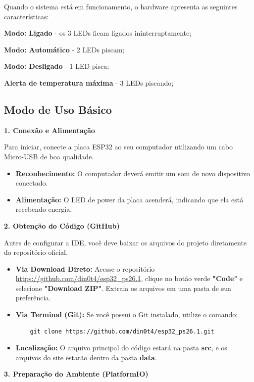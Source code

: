 Quando o sistema está em funcionamento, o hardware apresenta as seguintes características:

\textbf{Modo: Ligado} - os 3 LEDs ficam ligados ininterruptamente;

\textbf{Modo: Automático} - 2 LEDs piscam;

\textbf{Modo: Desligado} - 1 LED pisca;

\textbf{Alerta de temperatura máxima} - 3 LEDs piscando;

\subsection{Modo de Uso Básico}

\textbf{\large 1. Conexão e Alimentação}

Para iniciar, conecte a placa ESP32 ao seu computador utilizando um cabo Micro-USB de boa qualidade.
\begin{itemize}
    \item \textbf{Reconhecimento:} O computador deverá emitir um som de novo dispositivo conectado.
    \item \textbf{Alimentação:} O LED de power da placa acenderá, indicando que ela está recebendo energia.
\end{itemize}


\textbf{\large 2. Obtenção do Código (GitHub)} 

Antes de configurar a IDE, você deve baixar os arquivos do projeto diretamente do repositório oficial.

\begin{itemize}
    \item \textbf{Via Download Direto:} Acesse o repositório \url{https://github.com/din0t4/esp32_ps26.1}, clique no botão verde \textbf{"Code"} e selecione \textbf{"Download ZIP"}. Extraia os arquivos em uma pasta de sua preferência.
    \item \textbf{Via Terminal (Git):} Se você possui o Git instalado, utilize o comando:
    \begin{verbatim}
    git clone https://github.com/din0t4/esp32_ps26.1.git
    \end{verbatim}
    \item \textbf{Localização:} O arquivo principal do código estará na pasta \textbf{src}, e os arquivos do site estarão dentro da pasta \textbf{data}.
\end{itemize}


\textbf{\large 3. Preparação do Ambiente (PlatformIO)} 

